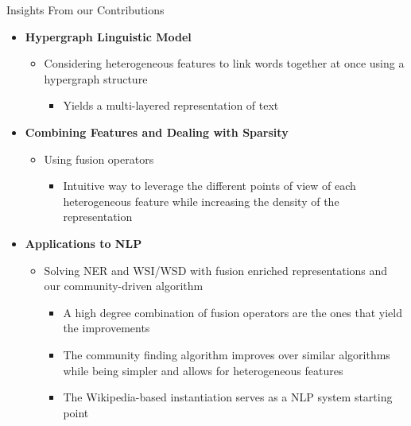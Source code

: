 \documentclass[10pt,xcolor=table]{beamer}
\begin{document}
\begin{frame}{Insights From our Contributions}
\begin{itemize}[<+- | alert@+>]
\item \textbf{Hypergraph Linguistic Model}
	\begin{itemize}
	\item Considering heterogeneous features to link words together at once using a hypergraph structure
		\begin{itemize}	
		\item Yields a multi-layered representation of text
		\end{itemize}
	\end{itemize}
\item \textbf{Combining Features and Dealing with Sparsity}
	\begin{itemize}
	\item Using fusion operators
		\begin{itemize}	
			\item Intuitive way to leverage the different points of view of each heterogeneous feature while increasing the density of the representation
		\end{itemize}

	\end{itemize}
\item \textbf{Applications to NLP}
	\begin{itemize}
	\item Solving NER and WSI/WSD with fusion enriched representations and our community-driven algorithm
		\begin{itemize}	
		\item A high degree combination of fusion operators are the ones that yield the improvements
		\item The community finding algorithm improves over similar algorithms while being simpler and allows for heterogeneous features
		\item The Wikipedia-based instantiation serves as a NLP system starting point

		\end{itemize}
	
	\end{itemize}
\end{itemize}


\end{frame}
\end{document}
